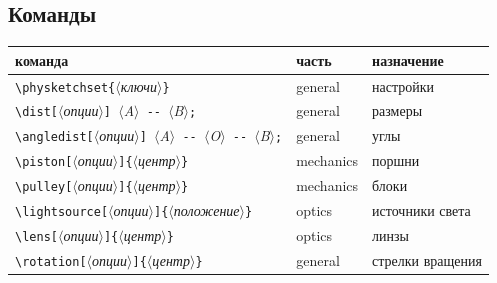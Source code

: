 \documentclass[a4paper,11pt]{article}
\newcommand\cs[1]{\texttt{\textbackslash#1}}
\newcommand\marg[1]{\texttt{\{}\meta{#1}\texttt{\}}}
\newcommand\oarg[1]{\texttt{[}\meta{#1}\texttt{]}}
\newcommand\meta[1]{\ensuremath{\langle}\textit{#1}\ensuremath{\rangle}}
\begin{document}
\subsection{Команды}
\begin{center}\small
\begin{tabular}{lll}
  \toprule
  команда & часть & назначение \\
  \midrule
  \cs{physketchset}\marg{ключи} & general & настройки \\
  \verb|\dist[|\meta{опции}\verb|] |\meta{A}\verb| -- |\meta{B}\verb|;| & general & размеры \\
  \verb|\angledist[|\meta{опции}\verb|] |\meta{A}\verb| -- |\meta{O}\verb| -- |\meta{B}\verb|;| & general & углы \\
  \cs{piston}\oarg{опции}\marg{центр} & mechanics & поршни \\
  \cs{pulley}\oarg{опции}\marg{центр} & mechanics & блоки \\
  \cs{lightsource}\oarg{опции}\marg{положение} & optics & источники света \\
  \cs{lens}\oarg{опции}\marg{центр} & optics & линзы \\
  \cs{rotation}\oarg{опции}\marg{центр} & general & стрелки вращения \\
  \bottomrule
\end{tabular}
\end{center}
\end{document}
